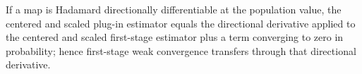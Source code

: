 If a map is Hadamard directionally differentiable at the population value, the centered and scaled plug-in estimator equals the directional derivative applied to the centered and scaled first-stage estimator plus a term converging to zero in probability; hence first-stage weak convergence transfers through that directional derivative.